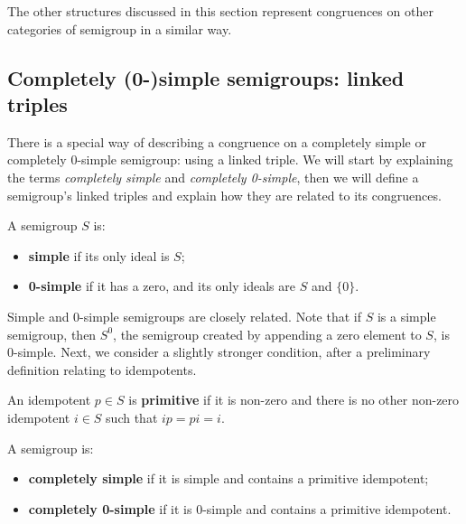 The other structures discussed in this section represent congruences on other
categories of semigroup in a similar way.

\subsection{Completely (0-)simple semigroups: linked triples}
\label{sec:linked-triples}

There is a special way of describing a congruence on a completely simple or
completely 0-simple semigroup: using a linked triple.  We will start by
explaining the terms \textit{completely simple} and \textit{completely
  0-simple}, then we will define a semigroup's linked triples and explain how
they are related to its congruences.

\begin{definition}
  \label{def:zerosimple}
  A semigroup $S$ is:
  \begin{itemize}
  \item \textbf{simple} if its only ideal is $S$;
  \item \textbf{0-simple} if it has a zero, and its only ideals are $S$ and
    $\{0\}$.
  \end{itemize}
\end{definition}

Simple and 0-simple semigroups are closely related.  Note that if $S$ is a
simple semigroup, then $S^0$, the semigroup created by appending a zero element
to $S$, is 0-simple.
Next, we consider a slightly stronger condition, after a preliminary definition
relating to idempotents.

\begin{definition}
  \label{def:primitive}
  An idempotent $p \in S$ is \textbf{primitive} if it is non-zero and there is
  no other non-zero idempotent $i \in S$ such that $ip = pi = i$.
\end{definition}

\begin{definition}
  \label{def:completelyzerosimple}
  A semigroup is:
  \begin{itemize}
  \item \textbf{completely simple} if it is simple and contains a primitive
    idempotent;
  \item \textbf{completely 0-simple} if it is 0-simple and contains a primitive
    idempotent.
  \end{itemize}
\end{definition}

